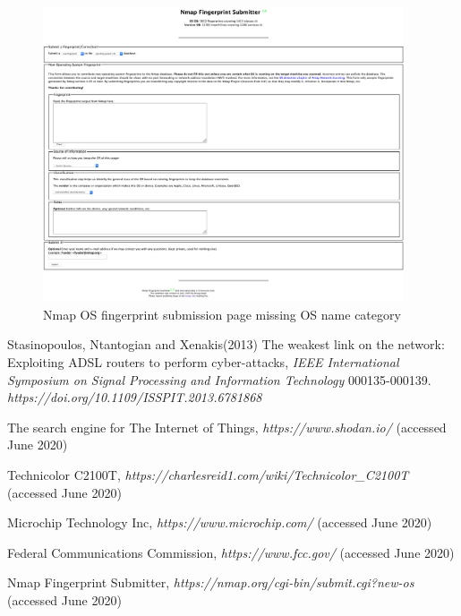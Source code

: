 \documentclass[10pt]{article}
\begin{document}
\begin{figure}[H]
\centering
\includegraphics[width=0.95\textwidth]{images/bug.png}
\caption{Nmap OS fingerprint submission page missing OS name category}\label{bug image}
\end{figure}

\begin{thebibliography}{9} 

 Stasinopoulos, Ntantogian and  Xenakis(2013) The weakest link on the network: Exploiting ADSL routers to perform cyber-attacks, \textit{IEEE International Symposium on Signal Processing and Information Technology} 000135-000139. \textit {https://doi.org/10.1109/ISSPIT.2013.6781868}

 The search engine for The Internet of Things, \textit{https://www.shodan.io/} (accessed June 2020)

 Technicolor C2100T, \textit{https://charlesreid1.com/wiki/Technicolor\_C2100T} (accessed June 2020)

 Microchip Technology Inc, \textit{https://www.microchip.com/} (accessed June 2020)

 Federal Communications Commission, \textit{https://www.fcc.gov/} (accessed June 2020)

 Nmap Fingerprint Submitter, \textit{https://nmap.org/cgi-bin/submit.cgi?new-os} (accessed June 2020)

\end{thebibliography}
\end{document}
